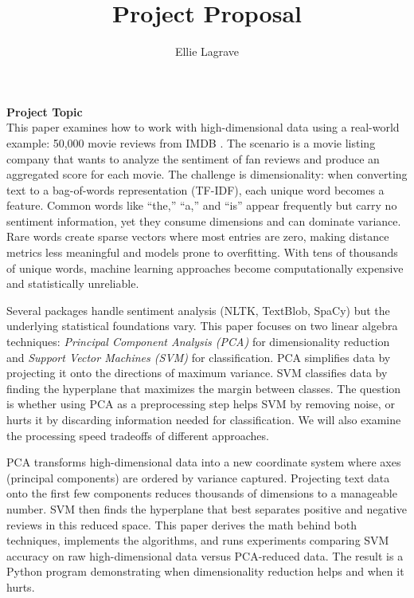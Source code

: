 \documentclass[runningheads]{llncs}
\begin{document}
\title{Project Proposal}
\author{Ellie Lagrave}
\maketitle

\noindent\textbf{Project Topic}\\

This paper examines how to work with high-dimensional data using a real-world example: 50,000 movie reviews from IMDB \cite{maas2011imdb}. The scenario is a movie listing company that wants to analyze the sentiment of fan reviews and produce an aggregated score for each movie. The challenge is dimensionality: when converting text to a bag-of-words representation (TF-IDF), each unique word becomes a feature. Common words like ``the,'' ``a,'' and ``is'' appear frequently but carry no sentiment information, yet they consume dimensions and can dominate variance. Rare words create sparse vectors where most entries are zero, making distance metrics less meaningful and models prone to overfitting. With tens of thousands of unique words, machine learning approaches become computationally expensive and statistically unreliable.

Several packages handle sentiment analysis (NLTK, TextBlob, SpaCy) but the underlying statistical foundations vary. This paper focuses on two linear algebra techniques: \textit{Principal Component Analysis (PCA)} for dimensionality reduction and \textit{Support Vector Machines (SVM)} for classification. PCA simplifies data by projecting it onto the directions of maximum variance. SVM classifies data by finding the hyperplane that maximizes the margin between classes. The question is whether using PCA as a preprocessing step helps SVM by removing noise, or hurts it by discarding information needed for classification. We will also examine the processing speed tradeoffs of different approaches.

PCA transforms high-dimensional data into a new coordinate system where axes (principal components) are ordered by variance captured. Projecting text data onto the first few components reduces thousands of dimensions to a manageable number. SVM then finds the hyperplane that best separates positive and negative reviews in this reduced space. This paper derives the math behind both techniques, implements the algorithms, and runs experiments comparing SVM accuracy on raw high-dimensional data versus PCA-reduced data. The result is a Python program demonstrating when dimensionality reduction helps and when it hurts.
\hfill \break
\end{document}
